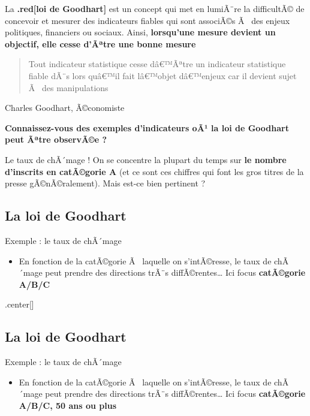 \documentclass[]{article}
\newcommand{\euro}{€}
\providecommand{\tightlist}{%
  \setlength{\itemsep}{0pt}\setlength{\parskip}{0pt}}
\begin{document}
La \textbf{.red{[}loi de Goodhart{]}} est un concept qui met en lumiÃ¨re
la difficultÃ© de concevoir et mesurer des indicateurs fiables qui sont
associÃ©s Ã~ des enjeux politiques, financiers ou sociaux. Ainsi,
\textbf{lorsqu'une mesure devient un objectif, elle cesse d'Ãªtre une
bonne mesure}

\begin{quote}
Tout indicateur statistique cesse dâ\euro{}™Ãªtre un indicateur
statistique fiable dÃ¨s lors quâ\euro{}™il fait lâ\euro{}™objet
dâ\euro{}™enjeux car il devient sujet Ã~ des manipulations
\end{quote}

Charles Goodhart, Ã©conomiste

\textbf{Connaissez-vous des exemples d'indicateurs oÃ¹ la loi de
Goodhart peut Ãªtre observÃ©e ?}

Le taux de chÃ´mage ! On se concentre la plupart du temps sur \textbf{le
nombre d'inscrits en catÃ©gorie A} (et ce sont ces chiffres qui font les
gros titres de la presse gÃ©nÃ©ralement). Mais est-ce bien pertinent ?

\subsection{La loi de Goodhart}\label{la-loi-de-goodhart-1}

Exemple : le taux de chÃ´mage

\begin{itemize}
\tightlist
\item
  En fonction de la catÃ©gorie Ã~ laquelle on s'intÃ©resse, le taux de
  chÃ´mage peut prendre des directions trÃ¨s diffÃ©rentes\ldots{} Ici
  focus \textbf{catÃ©gorie A/B/C}
\end{itemize}

.center{[}{]}

\subsection{La loi de Goodhart}\label{la-loi-de-goodhart-2}

Exemple : le taux de chÃ´mage

\begin{itemize}
\tightlist
\item
  En fonction de la catÃ©gorie Ã~ laquelle on s'intÃ©resse, le taux de
  chÃ´mage peut prendre des directions trÃ¨s diffÃ©rentes\ldots{} Ici
  focus \textbf{catÃ©gorie A/B/C, 50 ans ou plus}
\end{itemize}
\end{document}
